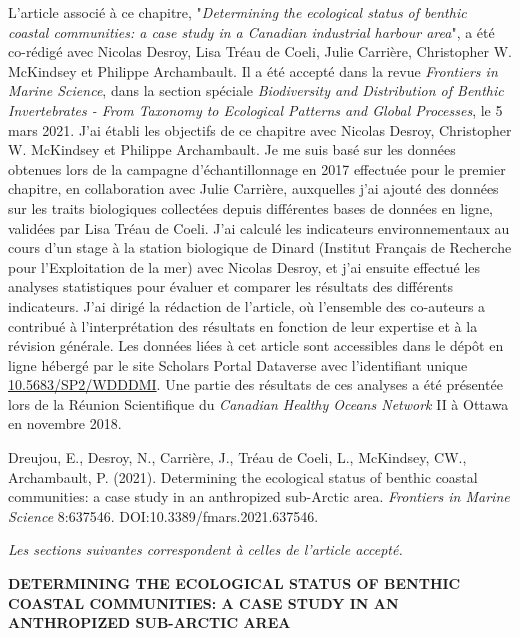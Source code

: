 L'article associé à ce chapitre, "\textit{Determining the ecological status of benthic coastal communities: a case study in a Canadian industrial harbour area}", a été co-rédigé avec Nicolas Desroy, Lisa Tréau de Coeli, Julie Carrière, Christopher W. McKindsey et Philippe Archambault. Il a été accepté dans la revue \textit{Frontiers in Marine Science}, dans la section spéciale \textit{Biodiversity and Distribution of Benthic Invertebrates - From Taxonomy to Ecological Patterns and Global Processes}, le 5 mars 2021. J'ai établi les objectifs de ce chapitre avec Nicolas Desroy, Christopher W. McKindsey et Philippe Archambault. Je me suis basé sur les données obtenues lors de la campagne d'échantillonnage en 2017 effectuée pour le premier chapitre, en collaboration avec Julie Carrière, auxquelles j'ai ajouté des données sur les traits biologiques collectées depuis différentes bases de données en ligne, validées par Lisa Tréau de Coeli. J'ai calculé les indicateurs environnementaux au cours d'un stage à la station biologique de Dinard (Institut Français de Recherche pour l'Exploitation de la mer) avec Nicolas Desroy, et j'ai ensuite effectué les analyses statistiques pour évaluer et comparer les résultats des différents indicateurs. J'ai dirigé la rédaction de l'article, où l'ensemble des co-auteurs a contribué à l'interprétation des résultats en fonction de leur expertise et à la révision générale. Les données liées à cet article sont accessibles dans le dépôt en ligne hébergé par le site Scholars Portal Dataverse avec l'identifiant unique \href{https://doi.org/10.5683/SP2/WDDDMI}{10.5683/SP2/WDDDMI}. Une partie des résultats de ces analyses a été présentée lors de la Réunion Scientifique du \textit{Canadian Healthy Oceans Network} II à Ottawa en novembre 2018. \linebreak[4]

\begin{singlespace}
Dreujou, E., Desroy, N., Carrière, J., Tréau de Coeli, L., McKindsey, CW., Archambault, P. (2021). Determining the ecological status of benthic coastal communities: a case study in an anthropized sub-Arctic area. \textit{Frontiers in Marine Science} 8:637546. DOI:10.3389/fmars.2021.637546.
\end{singlespace}

\textit{Les sections suivantes correspondent à celles de l'article accepté.}

\clearpage

\begin{center}
\textbf{DETERMINING THE ECOLOGICAL STATUS OF BENTHIC COASTAL COMMUNITIES: A CASE STUDY IN AN ANTHROPIZED SUB-ARCTIC AREA}
\end{center}
